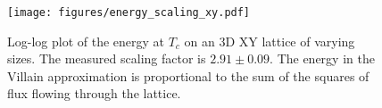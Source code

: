 \begin{figure}[h!]
    \centering
        \texttt{[image: figures/energy\_scaling\_xy.pdf]}
    \caption{Log-log plot of the energy at $T_c$ on an 3D XY lattice of varying sizes. The measured scaling factor is $2.91 \pm 0.09$. The energy in the Villain approximation is proportional to the sum of the squares of flux flowing through the lattice.}
    \label{fig:results_energyxy}
\end{figure}

